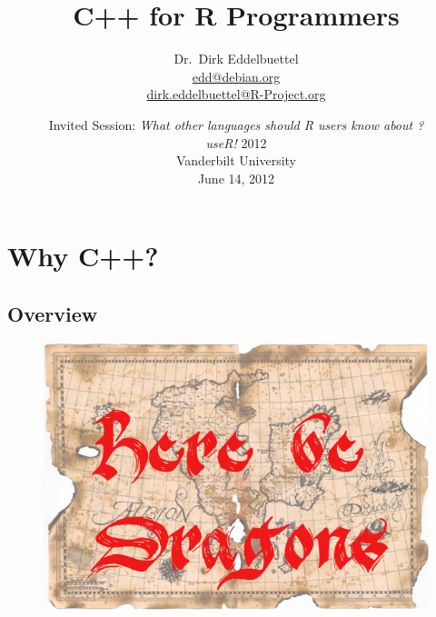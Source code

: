 \documentclass[dvipsnames,compress,pdflatex,beamer]{beamer}
\title[C++ for R Programmers]{C++ for R Programmers}
\author[Dirk Eddelbuettel]{Dr.~Dirk Eddelbuettel\\ \scriptsize\url{edd@debian.org}\\ \url{dirk.eddelbuettel@R-Project.org}}
\date[useR! 2012 @ Vanderbilt]{
  { \small 
    Invited Session: 
    \textsl{What other languages should R users know about ?}}\\[20pt] 
  \textsl{useR!} 2012\\ Vanderbilt University \\
  June 14, 2012  }
\begin{document}



\section[C++?]{Why C++?}

\subsection{Overview}

\begin{frame}

  \begin{figure}
    \includegraphics[scale=0.55]{images/there-be-dragons-map.jpg}
  \end{figure}

\end{frame}
\end{document}
